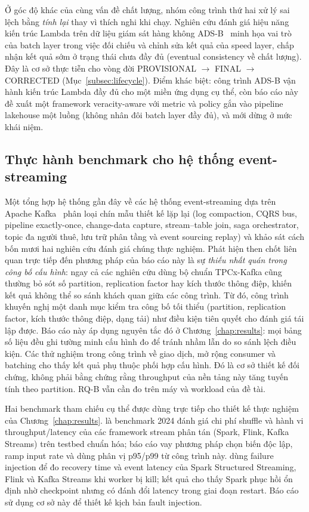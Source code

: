 Ở góc độ khác của cùng vấn đề chất lượng, nhóm công trình thứ hai xử lý sai
lệch bằng \emph{tính lại} thay vì thích nghi khi chạy. Nghiên cứu đánh giá
hiệu năng kiến trúc Lambda trên dữ liệu giám sát hàng
không ADS-B~\cite{lambda_adsb_2023} minh họa vai trò của batch layer trong
việc đối chiếu và chỉnh sửa kết quả của speed layer, chấp nhận kết quả sớm
ở trạng thái chưa đầy đủ (eventual consistency về chất lượng). Đây là cơ sở
thực tiễn cho vòng đời PROVISIONAL $\rightarrow$ FINAL $\rightarrow$ CORRECTED
(Mục~\ref{subsec:lifecycle}). Điểm khác biệt: công trình ADS-B vận hành kiến
trúc Lambda đầy đủ cho một miền ứng dụng cụ thể, còn báo cáo này đề xuất một
framework veracity-aware với metric và policy gắn vào pipeline lakehouse một
luồng (không nhân đôi batch layer đầy đủ), và mới dừng ở mức khái niệm.

\subsection{Thực hành benchmark cho hệ thống event-streaming}

Một tổng hợp hệ thống gần đây về các hệ thống event-streaming dựa trên Apache
Kafka~\cite{kafka_patterns_benchmark_2025} phân loại chín mẫu thiết kế lặp lại
(log compaction, CQRS bus, pipeline exactly-once, change-data capture,
stream--table join, saga orchestrator, topic đa người thuê, lưu trữ phân tầng và
event sourcing replay) và khảo sát cách bốn mươi hai nghiên cứu đánh giá chúng
thực nghiệm. Phát hiện then chốt liên quan trực tiếp đến phương pháp của báo
cáo này là sự \emph{thiếu nhất quán trong công bố cấu hình}: ngay cả các nghiên
cứu dùng bộ chuẩn TPCx-Kafka cũng thường bỏ sót số partition, replication factor
hay kích thước thông điệp, khiến kết quả không thể so sánh khách quan giữa các
công trình. Từ đó, công trình khuyến nghị một danh mục kiểm tra công bố tối
thiểu (partition, replication factor, kích thước thông điệp, dạng tải) như điều
kiện tiên quyết cho đánh giá tái lập được. Báo cáo này áp dụng nguyên tắc đó ở
Chương~\ref{chap:results}: mọi bảng số liệu đều ghi tường minh cấu hình đo để
tránh nhầm lẫn do so sánh lệch điều kiện. Các thử nghiệm trong công trình về giao dịch, mở rộng consumer và
batching cho thấy kết quả phụ thuộc phối hợp cấu hình. Đó là cơ sở thiết
kế đối chứng, không phải bằng chứng rằng throughput của nền tảng này tăng
tuyến tính theo partition. RQ-B vẫn cần đo trên máy và workload của đề tài.

Hai benchmark tham chiếu cụ thể được dùng trực tiếp cho thiết kế thực
nghiệm của Chương~\ref{chap:results}. \cite{shufflebench_2024} là benchmark
2024 đánh giá chi phí shuffle và hành vi throughput/latency của các framework
stream phân tán (Spark, Flink, Kafka Streams) trên testbed chuẩn hóa; báo
cáo vay phương pháp chọn biến độc lập, ramp input rate và dùng phân vị
p95/p99 từ công trình này. \cite{fault_recovery_stream_2024} dùng failure
injection để đo recovery time và event latency của Spark Structured
Streaming, Flink và Kafka Streams khi worker bị kill; kết quả cho thấy Spark
phục hồi ổn định nhờ checkpoint nhưng có đánh đổi latency trong giai đoạn
restart. Báo cáo sử dụng cơ sở này để thiết kế kịch bản fault injection.

